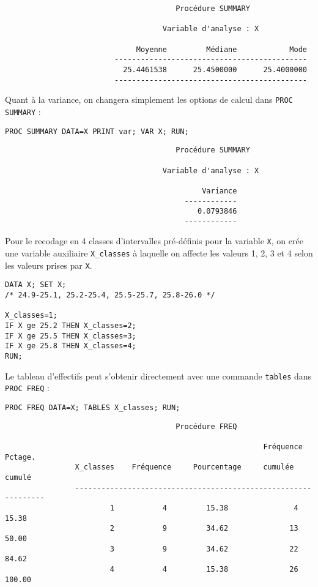 \begin{verbatim}
                                       Procédure SUMMARY

                                    Variable d'analyse : X

                              Moyenne         Médiane            Mode
                         --------------------------------------------
                           25.4461538      25.4500000      25.4000000
                         --------------------------------------------
\end{verbatim}

Quant à la variance, on changera simplement les options de calcul dans
\texttt{PROC SUMMARY} :
\begin{verbatim}
PROC SUMMARY DATA=X PRINT var; VAR X; RUN;
\end{verbatim}

\begin{verbatim}
                                       Procédure SUMMARY

                                    Variable d'analyse : X

                                             Variance
                                         ------------
                                            0.0793846
                                         ------------
\end{verbatim}

Pour le recodage en 4 classes d'intervalles pré-définis pour la variable
\texttt{X}, on crée une variable auxiliaire \verb|X_classes| à laquelle on
affecte les valeurs 1, 2, 3 et 4 selon les valeurs prises par \texttt{X}.
\begin{verbatim}
DATA X; SET X;
/* 24.9-25.1, 25.2-25.4, 25.5-25.7, 25.8-26.0 */

X_classes=1;
IF X ge 25.2 THEN X_classes=2;
IF X ge 25.5 THEN X_classes=3;
IF X ge 25.8 THEN X_classes=4;
RUN;
\end{verbatim}
Le tableau d'effectifs peut s'obtenir directement avec une commande
\texttt{tables} dans \texttt{PROC FREQ} :
\begin{verbatim}
PROC FREQ DATA=X; TABLES X_classes; RUN;
\end{verbatim}

\begin{verbatim}
                                       Procédure FREQ

                                                           Fréquence    Pctage.
                X_classes    Fréquence     Pourcentage     cumulée      cumulé
                ---------------------------------------------------------------
                        1           4         15.38               4      15.38
                        2           9         34.62              13      50.00
                        3           9         34.62              22      84.62
                        4           4         15.38              26     100.00
\end{verbatim}

